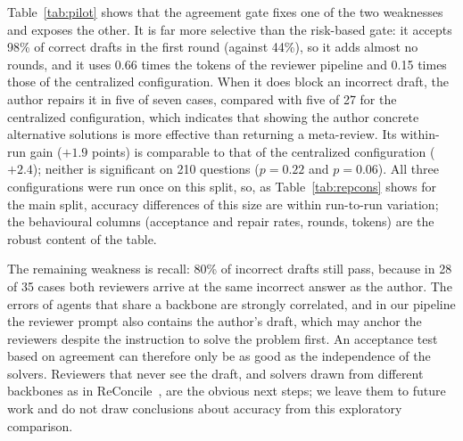 Table~\ref{tab:pilot} shows that the agreement gate fixes one of the two weaknesses and exposes the other.
It is far more selective than the risk-based gate: it accepts 98\% of correct drafts in the first round (against 44\%), so it adds almost no rounds, and it uses 0.66 times the tokens of the reviewer pipeline and 0.15 times those of the centralized configuration.
When it does block an incorrect draft, the author repairs it in five of seven cases, compared with five of 27 for the centralized configuration, which indicates that showing the author concrete alternative solutions is more effective than returning a meta-review.
Its within-run gain (\(+1.9\) points) is comparable to that of the centralized configuration (\(+2.4\)); neither is significant on 210 questions (\(p=0.22\) and \(p=0.06\)).
All three configurations were run once on this split, so, as Table~\ref{tab:repcons} shows for the main split, accuracy differences of this size are within run-to-run variation; the behavioural columns (acceptance and repair rates, rounds, tokens) are the robust content of the table.

The remaining weakness is recall: 80\% of incorrect drafts still pass, because in 28 of 35 cases both reviewers arrive at the same incorrect answer as the author.
The errors of agents that share a backbone are strongly correlated, and in our pipeline the reviewer prompt also contains the author's draft, which may anchor the reviewers despite the instruction to solve the problem first.
An acceptance test based on agreement can therefore only be as good as the independence of the solvers.
Reviewers that never see the draft, and solvers drawn from different backbones as in ReConcile~\cite{chen2024reconcile}, are the obvious next steps; we leave them to future work and do not draw conclusions about accuracy from this exploratory comparison.
